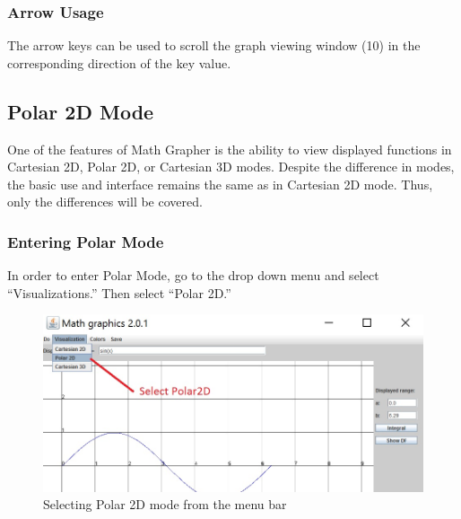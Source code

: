 \documentclass{article}[12 pt]
\begin{document}
			\subsubsection{Arrow Usage}
			The arrow keys can be used to scroll the graph viewing window (10) in the corresponding direction of the key value. 
			
	\subsection{Polar 2D Mode}
		One of the features of Math Grapher is the ability to view displayed functions in Cartesian 2D, Polar 2D, or Cartesian 3D modes. Despite the difference in modes, the basic use and interface remains the same as in Cartesian 2D mode. Thus, only the differences will be covered.
	\pagebreak	
		\subsubsection{Entering Polar Mode}
			In order to enter Polar Mode, go to the drop down menu and select ``Visualizations.'' Then select ``Polar 2D.'' 
				\begin{figure}[h!]
					\centering
					\includegraphics[scale = .85]{polar}
					\caption{Selecting Polar 2D mode from the menu bar}
				\end{figure}
				
\end{document}
